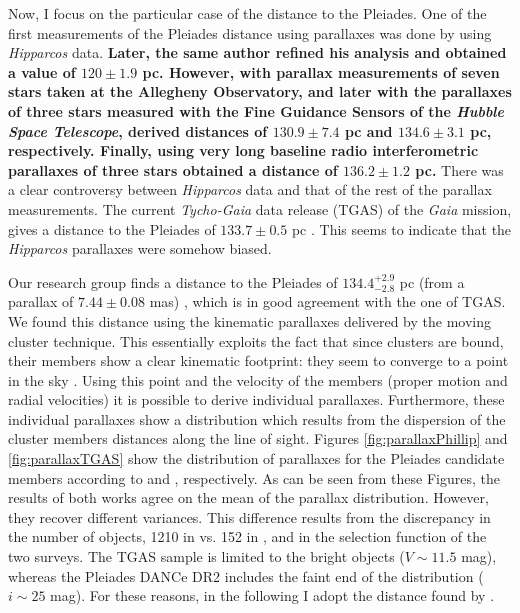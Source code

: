 Now, I focus on the particular case of the distance to the Pleiades. One of the first measurements of the Pleiades distance using parallaxes was done by \citet{1999A&A...341L..71V} using \emph{Hipparcos} data.\textbf{ Later, the same author \citep{2009A&A...497..209V} refined his analysis and obtained a value of $120\pm1.9$ pc. However, \citet{2000ApJ...533..938G} with parallax measurements of seven stars taken at the Allegheny Observatory, and later \citet{2005AJ....129.1616S} with the parallaxes of three stars measured with the Fine Guidance Sensors of the \emph{Hubble Space Telescope}, derived distances of $130.9\pm7.4$ pc and $134.6\pm3.1$ pc, respectively. Finally, \citet{2014Sci...345.1029M} using very long baseline radio interferometric parallaxes of three stars obtained a distance of $136.2\pm1.2$ pc.} There was a clear controversy between \emph{Hipparcos} data and that of the rest of the parallax measurements. The current \emph{Tycho-Gaia} data release (TGAS) of the \emph{Gaia} mission, gives a distance to the Pleiades of $133.7\pm0.5$ pc \cite[from a parallax of $7.48\pm0.03$ mas][]{2017A&A...601A..19G}. This seems to indicate that the \emph{Hipparcos} parallaxes were somehow biased.

Our research group finds a distance to the Pleiades of $134.4^{+2.9}_{-2.8} $ pc (from a parallax of $7.44\pm0.08$ mas) \citep{Galli2017}, which is in good agreement with the one of TGAS. We found this distance using the kinematic parallaxes delivered by the moving cluster technique. This essentially exploits the fact that since clusters are bound, their members show a clear kinematic footprint: they seem to converge to a point in the sky \citep{1964IAUS...20...50B}. Using this point and the velocity of the members (proper motion and radial velocities) it is possible to derive individual parallaxes. Furthermore, these individual parallaxes show a distribution which results from the dispersion of the cluster members distances along the line of sight. Figures \ref{fig:parallaxPhillip} and \ref{fig:parallaxTGAS} show the distribution of parallaxes for the Pleiades candidate members according to \citet{Galli2017} and \citet{2017A&A...601A..19G}, respectively. As can be seen from these Figures, the results of both works agree on the mean of the parallax distribution. However, they recover different variances. This difference results from the discrepancy in the number of objects, 1210 in \citet{Galli2017} vs. 152 in \citet{2017A&A...601A..19G}, and in the selection function of the two surveys. The TGAS sample is limited to the bright objects ($V \sim 11.5$ mag), whereas the Pleiades DANCe DR2 includes the faint end of the distribution ($i\sim25$ mag). For these reasons, in the following I adopt the distance found by \citet{Galli2017}.

